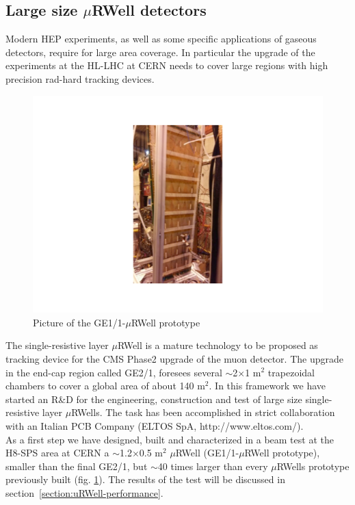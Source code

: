 \subsection{Large size $\mu$RWell detectors}
\label{sec:large-size}
%
Modern HEP experiments, as well as some specific applications of gaseous detectors, require for large area coverage. In particular the upgrade of the experiments at the HL-LHC at CERN needs to cover large regions with high precision rad-hard tracking devices.
%
\begin{figure}[h]
	\begin{center}
    	\includegraphics[scale=0.45]{Figures/Muon/microrwell-GE11.pdf}
        \caption{Picture of the GE1/1-$\mu$RWell prototype}
        \label{GE1/1}
    \end{center}
\end{figure}
%
The single-resistive layer $\mu$RWell is a mature technology to be proposed as tracking device for the CMS Phase2 upgrade of the muon detector. The upgrade in the end-cap region called GE2/1,  foresees several $\sim$2$\times$1 m$^2$ trapezoidal chambers to cover a global area of about 140 m$^2$. 
In this framework we have started an R\&D for the engineering, construction and test of large size single-resistive layer $\mu$RWells. The task has been accomplished in strict collaboration with an Italian PCB Company (ELTOS SpA, http://www.eltos.com/).\\
As a first step we have designed, built and characterized in a beam test at the H8-SPS area at CERN a $\sim$1.2$\times$0.5 m$^2$ $\mu$RWell (GE1/1-$\mu$RWell prototype), smaller than the final GE2/1, but $\sim$40 times larger than every $\mu$RWells prototype previously built (fig. \ref{GE1/1}). 
The results of the test will be discussed in section~\ref{section:uRWell-performance}.

